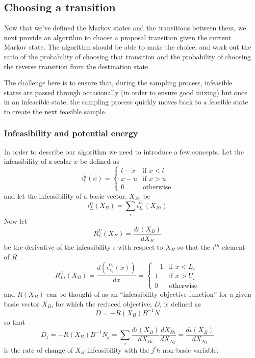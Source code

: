 \documentclass{article}
\begin{document}
\subsection{Choosing a transition}

Now that we've defined the Markov states and the transitions between them, we next provide an algorithm to choose a proposal transition given the current Markov state. The algorithm should be able to make the choice, and work out the ratio of the probability of choosing that transition and the probability of choosing the reverse transition from the destination state.

The challenge here is to ensure that, during the sampling process, infeasible states are passed through occasionally (in order to ensure good mixing) but once in an infeasible state, the sampling process quickly moves back to a feasible state to create the next feasible sample.

\subsubsection{Infeasibility and potential energy}

In order to describe our algorithm we need to introduce a few concepts. Let the infeasibility of a scalar $x$ be defined as
\[
\iota^u_l(x) =
\begin{cases}
l-x & \text{if }x<l\\
x-u & \text{if }x>u\\
0 & \text{otherwise}
\end{cases}
\]
and let the infeasibility of a basic vector, $X_B$, be
\[
\iota^U_L(X_B) = \sum_i \iota^{U_i}_{L_i}(X_{Bi})
\]
Now let
\[
R^U_L(X_B) = \frac{d\iota(X_B)}{dX_B}
\]
be the derivative of the infeasibility $\iota$ with respect to $X_B$ so that the $i^{th}$ element of $R$
\[
R^U_{Li}(X_B) = \frac{d\left(\iota^{U_i}_{L_i}(x)\right)}{dx} =
\begin{cases}
-1 & \text{if }x<L_i\\
1 & \text{if }x>U_i\\
0 & \text{otherwise}
\end{cases}
\]
and $R(X_B)$ can be thought of as an ``infeasibility objective function'' for a given basic vector $X_B$, for which the reduced objective, $D$, is defined as
\[
D = -R(X_B)B^{-1}N
\]
so that
\[
D_j = -R(X_B)B^{-1}N_j = \sum_i \frac{d\iota(X_B)}{dX_{Bi}} \frac{dX_{Bi}}{dX_{Nj}} = \frac{d\iota(X_B)}{dX_{Nj}}
\]
is the rate of change of $X_B$-infeasibility with the $j^th$ non-basic variable.
\end{document}

